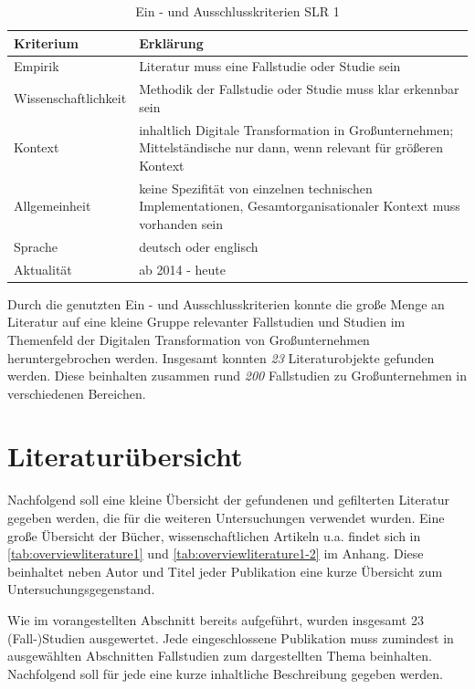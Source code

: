 \begin{table}[ht]
	\centering
	\caption{Ein - und Ausschlusskriterien SLR 1}
	\begin{tabular}{|p{4cm}|p{8cm}|}
		\hline
		\textbf{Kriterium}& \textbf{Erklärung}  \\
		\hline
		Empirik & Literatur muss eine Fallstudie oder Studie sein \\
		Wissenschaftlichkeit & Methodik der  Fallstudie oder Studie muss klar erkennbar sein \\
		Kontext & inhaltlich Digitale Transformation in Großunternehmen; Mittelständische nur dann, wenn relevant für größeren Kontext \\
		Allgemeinheit & keine Spezifität von einzelnen technischen Implementationen, Gesamtorganisationaler Kontext muss vorhanden sein \\
		Sprache & deutsch oder englisch \\
		Aktualität & ab 2014 - heute  \\
		\hline
	\end{tabular}
	\label{tab:criteriaslr1}
\end{table}

Durch die genutzten Ein - und Ausschlusskriterien konnte die große Menge an Literatur auf eine kleine Gruppe relevanter Fallstudien und Studien im Themenfeld der Digitalen Transformation von Großunternehmen heruntergebrochen werden. Insgesamt konnten \textit{23} Literaturobjekte gefunden werden. Diese beinhalten zusammen rund \textit{200} Fallstudien zu Großunternehmen in verschiedenen Bereichen.

\section{Literaturübersicht}


Nachfolgend soll eine kleine Übersicht der gefundenen und gefilterten Literatur gegeben werden, die für die weiteren Untersuchungen verwendet wurden. Eine große Übersicht der  Bücher, wissenschaftlichen Artikeln u.a. findet sich in \ref{tab:overviewliterature1} und \ref{tab:overviewliterature1-2} im Anhang. Diese beinhaltet neben Autor und Titel jeder Publikation eine kurze Übersicht zum Untersuchungsgegenstand.

Wie im vorangestellten Abschnitt bereits aufgeführt, wurden insgesamt 23 (Fall-)Studien ausgewertet. Jede eingeschlossene Publikation muss zumindest in ausgewählten Abschnitten Fallstudien zum dargestellten Thema beinhalten. Nachfolgend soll für jede eine kurze inhaltliche Beschreibung gegeben werden.

